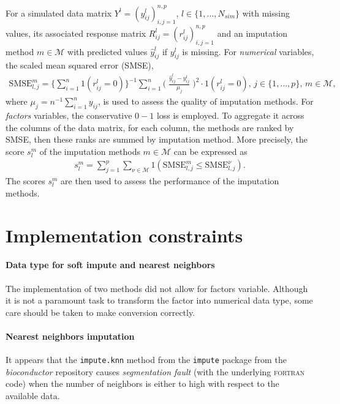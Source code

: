 For a simulated data matrix $Y^l = (y^l_{ij})_{i,j=1}^{n,p}$,
$l \in \{1, \dots, N_{sim}\}$ with missing values, its associated response
matrix $R_{ij}^l = (r_{ij}^l)_{i,j=1}^{n, p}$ and an imputation method
$m \in \mathcal{M}$ with predicted values $\hat y^l_{ij}$ if $y^l_{ij}$ is
missing. For \emph{numerical} variables, the scaled mean squared error (SMSE),
\begin{align}\label{eq:smse}
  \textrm{SMSE}^{m}_{l,j} = \Big\{\sum_{i=1}^n 1(r^l_{ij}=0)\Big\}^{-1} \sum_{i=1}^{n} \Big(\;\frac{\hat y_{ij}^l - y^l_{ij}}{\mu_j}\;\Big)^2 \cdot 1(r^l_{ij}=0),
  \, j \in \{1, \dots, p\}, \, m \in \mathcal{M},
\end{align}
where $\mu_j = n^{-1}\sum_{i=1}^n y_{ij}$, is used to assess the quality of
imputation methods. For \emph{factors} variables, the conservative $0-1$ loss
is employed. To aggregate it across the columns of the data matrix, for each
column, the methods are ranked by SMSE, then these ranks are summed by
imputation method. More precisely, the score $s^m_l$ of the imputation methods
$m \in \mathcal{M}$ can be expressed as
\begin{align} \label{eq:score:imputation}
  s^{m}_{l} = \sum_{j=1}^p \sum_{\nu \in \mathcal{M}} 1(\textrm{SMSE}^{m}_{l,j} \leq \textrm{SMSE}^{\nu}_{l,j}).
\end{align}
The scores $s^m_l$ are then used to assess the performance of the imputation
methods.

\section{Implementation constraints}

\paragraph{Data type for soft impute and nearest neighbors}
The implementation of two methods did not allow for factors variable. Although
it is not a paramount task to transform the factor into numerical data type,
some care should be taken to make conversion correctly.

\paragraph{Nearest neighbors imputation}
It appears that the \texttt{impute.knn} method from the \texttt{impute} package
from the \emph{bioconductor} repository causes \emph{segmentation fault} (with
the underlying \textsc{fortran} code) when the number of neighbors is either to
high with respect to the available data.

